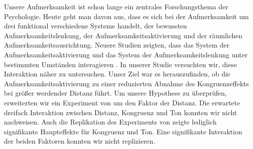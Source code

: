 Unsere Aufmerksamkeit ist schon lange ein zentrales Forschungsthema der Psychologie. Heute geht man davon aus, dass es sich bei der Aufmerksamkeit um drei funktional verschiedene Systeme handelt, der bewussten Aufmerksamkeitslenkung, der Aufmerksamkeitsaktivierung und der räumlichen Aufmerksamkeitsausrichtung.
Neuere Studien zeigten, dass das System der Aufmerksamkeitsaktivierung und das System der Aufmerksamkeitslenkung unter bestimmten Umständen interagieren \cite{weinbach2012relationship}.
In unserer Studie versuchten wir, diese Interaktion näher zu untersuchen.
Unser Ziel war es herauszufinden, ob die Aufmerksamkeitsaktivierung zu einer reduzierten Abnahme des Kongruenzeffekts bei größer werdender Distanz führt. 
Um unsere Hypothese zu überprüfen, erweiterten wir ein Experiment von \textcite{weinbach2012relationship} um den Faktor der Distanz.
Die erwartete dreifach Interaktion zwischen Distanz, Kongruenz und Ton konnten wir nicht nachweisen. 
Auch die Replikation des Experiments von \textcite{weinbach2012relationship} zeigte lediglich signifikante Haupteffekte für Kongruenz und Ton.
Eine signifikante Interaktion der beiden Faktoren konnten wir nicht replizieren. 
